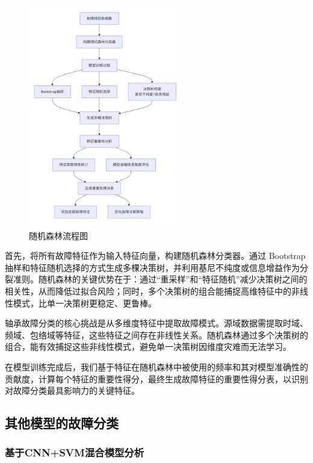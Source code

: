 \documentclass[a4paper]{CPIPC}
\numberwithin{equation}{section}
\begin{document}
\begin{figure}[H]
  \centering
  \includegraphics[width=0.6\textwidth]{随机森林流程图.jpeg}
  \caption{随机森林流程图}
  \label{fig:confidence}
\end{figure}


首先，将所有故障特征作为输入特征向量，构建随机森林分类器。通过 Bootstrap 抽样和特征随机选择的方式生成多棵决策树，并利用基尼不纯度或信息增益作为分裂准则。随机森林的关键优势在于：通过“重采样”和“特征随机”减少决策树之间的相关性，从而降低过拟合风险；同时，多个决策树的组合能捕捉高维特征中的非线性模式，比单一决策树更稳定、更鲁棒。

轴承故障分类的核心挑战是从多维度特征中提取故障模式。源域数据需提取时域、频域、包络域等特征，这些特征之间存在非线性关系。随机森林通过多个决策树的组合，能有效捕捉这些非线性模式，避免单一决策树因维度灾难而无法学习。

在模型训练完成后，我们基于特征在随机森林中被使用的频率和其对模型准确性的贡献度，计算每个特征的重要性得分，最终生成故障特征的重要性得分表，以识别对故障分类最具影响力的关键特征。

\subsection{其他模型的故障分类}

\subsubsection{基于CNN+SVM混合模型分析}
\end{document}

